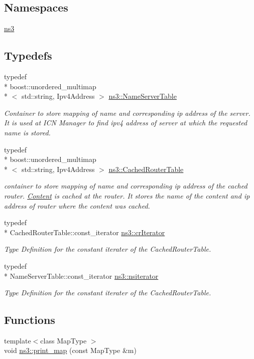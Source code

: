 \subsection*{Namespaces}
\begin{DoxyCompactItemize}
\item 
\hyperlink{namespacens3}{ns3}
\end{DoxyCompactItemize}
\subsection*{Typedefs}
\begin{DoxyCompactItemize}
\item 
typedef \\*
boost\-::unordered\-\_\-multimap\\*
$<$ std\-::string, Ipv4\-Address $>$ \hyperlink{namespacens3_a30b2bc59285e3015fedd6268c6f77947}{ns3\-::\-Name\-Server\-Table}
\begin{DoxyCompactList}\small\item\em Container to store mapping of name and corresponding ip address of the server. It is used at I\-C\-N Manager to find ipv4 address of server at which the requested name is stored. \end{DoxyCompactList}\item 
typedef \\*
boost\-::unordered\-\_\-multimap\\*
$<$ std\-::string, Ipv4\-Address $>$ \hyperlink{namespacens3_a6e64320f2e97002ba6cd340bbfb76767}{ns3\-::\-Cached\-Router\-Table}
\begin{DoxyCompactList}\small\item\em container to store mapping of name and corresponding ip address of the cached router. \hyperlink{classns3_1_1Content}{Content} is cached at the router. It stores the name of the content and ip address of router where the content was cached. \end{DoxyCompactList}\item 
typedef \\*
Cached\-Router\-Table\-::const\-\_\-iterator \hyperlink{namespacens3_a0d17c0f2e1efb713fe4a62d283039f06}{ns3\-::cr\-Iterator}
\begin{DoxyCompactList}\small\item\em Type Definition for the constant iterater of the Cached\-Router\-Table. \end{DoxyCompactList}\item 
typedef \\*
Name\-Server\-Table\-::const\-\_\-iterator \hyperlink{namespacens3_a81ca04d4bcf5358cad6f7b2d7fd0fe2a}{ns3\-::nsiterator}
\begin{DoxyCompactList}\small\item\em Type Definition for the constant iterater of the Cached\-Router\-Table. \end{DoxyCompactList}\end{DoxyCompactItemize}
\subsection*{Functions}
\begin{DoxyCompactItemize}
\item 
{\footnotesize template$<$class Map\-Type $>$ }\\void \hyperlink{namespacens3_ab673fe087092e83ec770c736b6cb6c3f}{ns3\-::print\-\_\-map} (const Map\-Type \&m)
\end{DoxyCompactItemize}
